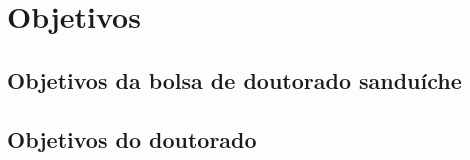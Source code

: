 \section{Objetivos}\label{sec:goals}

\subsection{Objetivos da bolsa de doutorado sanduíche}

\subsection{Objetivos do doutorado}